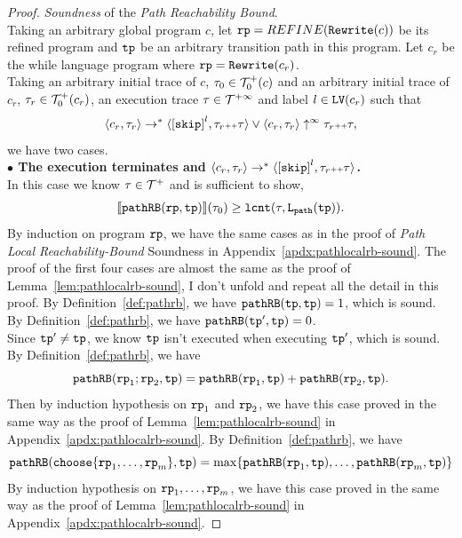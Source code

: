 \begin{proof}
\emph{Soundness} of the \emph{Path Reachability Bound}.
  \\
  Taking an arbitrary global program $c$, let $\mathtt{rp} = REFINE(\mathtt{Rewrite}(c))$ be its refined program and $\mathtt{tp}$ be an arbitrary transition path in this program.
  Let $c_r$ be the while language program where $\mathtt{rp} = \mathtt{Rewrite}(c_r)$.
  \\
  Taking an arbitrary initial trace of $c$, $\mathtt{\tau}_0 \in \mathcal{T}^{+}_0(c)$ and an arbitrary initial trace of $c_r$, $\mathtt{\tau}_r \in \mathcal{T}^{+}_0(c_r)$, 
 an execution trace $\mathtt{\tau} \in \mathcal{T}^{+\infty}$ and label $l \in \mathtt{LV}(c_r)$
 such that 
 \[
  \config{{c_r}, \trace_r} \to^{*} \config{\clabel{\eskip}^{l}, \trace_r \tracecat \trace} \lor \config{c_r, \trace_r} \uparrow^{\infty} \trace_r \tracecat \trace,
  \]
 we have two cases.
\\
\textbf{$\bullet$ The execution terminates and {$\config{{c_r}, \trace_r} \to^{*} \config{\clabel{\eskip}^{l}, \trace_r \tracecat \trace}$}.} 
\\
 In this case we know $\mathtt{\tau} \in \mathcal{T}^{+}$ and is sufficient to show,
 \[
 \llbracket \mathtt{pathRB}(\mathtt{rp}, \mathtt{tp}) \rrbracket(\mathtt{\tau}_0) \geq \mathtt{lcnt}(\mathtt{\tau}, \mathtt{L}_{\mathtt{path}}(\mathtt{tp})) .
 \]
By induction on program $\mathtt{rp}$, we have the same cases as in the proof of \emph{Path Local Reachability-Bound} Soundness in Appendix~\ref{apdx:pathlocalrb-sound}.
The proof of the first four cases are almost the same as the proof of Lemma~\ref{lem:pathlocalrb-sound}, I don't unfold and repeat all the detail in this proof.
\caseL{$\rprog = \tpath$}
By Definition~\ref{def:pathrb}, we have $\mathtt{pathRB}(\mathtt{tp}, \mathtt{tp}) = 1$, which is sound.
By Definition~\ref{def:pathrb}, we have $\mathtt{pathRB}(\mathtt{tp}', \mathtt{tp}) = { 0}$.
\\
Since $\mathtt{tp}' \neq \mathtt{tp}$, we know $\mathtt{tp}$ isn't executed when executing $\mathtt{tp}'$, which is sound.
By Definition~\ref{def:pathrb}, we have
\[
  \mathtt{pathRB}(\mathtt{rp}_1;\mathtt{rp}_2, \mathtt{tp}) = \mathtt{pathRB}(\mathtt{rp}_1, \mathtt{tp}) + \mathtt{pathRB}(\mathtt{rp}_2, \mathtt{tp}). 
\]
Then by induction hypothesis on $\mathtt{rp}_1$ and $\mathtt{rp}_2$, we have this case proved in the same way as the proof of Lemma~\ref{lem:pathlocalrb-sound} in Appendix~\ref{apdx:pathlocalrb-sound}.
By Definition~\ref{def:pathrb}, we have 
\[
\inoutB(\rpchoose{\rprog_1, \ldots, \rprog_m }, \tpath) = 
\max\left\{ \inoutB(\rprog_1, \tpath), \ldots, \inoutB(\rprog_m, \tpath) \right\}
\] 
By induction hypothesis on $\mathtt{rp}_1, \ldots, \mathtt{rp}_m$, we have this case proved in the same way as the proof of Lemma~\ref{lem:pathlocalrb-sound} in Appendix~\ref{apdx:pathlocalrb-sound}.

\end{proof}
